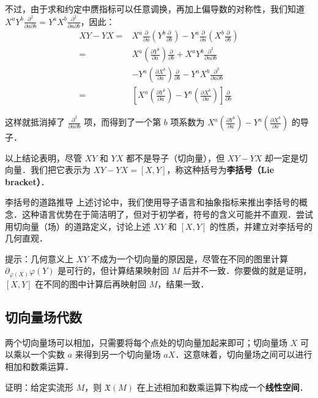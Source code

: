 不过，由于求和约定中赝指标可以任意调换，再加上偏导数的对称性，我们知道 $X^aY^b\frac{\partial^2}{\partial a\partial b}=Y^aX^b\frac{\partial^2}{\partial a\partial b}$，因此：
\begin{equation}
\begin{aligned}
XY-YX=&X^a\frac{\partial}{\partial a}(Y^b\frac{\partial}{\partial b})-Y^a\frac{\partial}{\partial a}(X^b\frac{\partial}{\partial b})\\
=&X^a(\frac{\partial Y^b}{\partial a})\frac{\partial}{\partial b}+X^aY^b\frac{\partial^2}{\partial a\partial b}\\&-Y^a(\frac{\partial X^b}{\partial a})\frac{\partial}{\partial b}-Y^aX^b\frac{\partial^2}{\partial a\partial b}\\
=&[X^a(\frac{\partial Y^b}{\partial a})-Y^a(\frac{\partial X^b}{\partial a})]\frac{\partial}{\partial b}
\end{aligned}
\end{equation}

这样就抵消掉了 $\frac{\partial^2}{\partial a\partial b}$ 项，而得到了一个第 $b$ 项系数为 $X^a(\frac{\partial Y^b}{\partial a})-Y^a(\frac{\partial X^b}{\partial a})$ 的导子．

以上结论表明，尽管 $XY$ 和 $YX$ 都不是导子（切向量），但 $XY-YX$ 却一定是切向量．我们把它表示为 $XY-YX=[X, Y]$，称这种括号为\textbf{李括号（Lie bracket）}．

\begin{exercise}{李括号的道路推导}\label{Vec_exe1}
上述讨论中，我们使用导子语言和抽象指标来推出李括号的概念．这种语言优势在于简洁明了，但对于初学者，符号的含义可能并不直观．尝试用切向量（场）的道路定义，讨论上述 $XY$ 和 $[X, Y]$ 的性质，并建立对李括号的几何直观．

提示：几何意义上 $XY$ 不成为一个切向量的原因是，尽管在不同的图里计算 $\partial_{\varphi(X)}\varphi(Y)$ 是可行的，但计算结果映射回 $M$ 后并不一致．你要做的就是证明，$[X, Y]$ 在不同的图中计算后再映射回 $M$，结果一致．
\end{exercise}

\subsection{切向量场代数}

两个切向量场可以相加，只需要将每个点处的切向量加起来即可；切向量场 $X$ 可以乘以一个实数 $a$ 来得到另一个切向量场 $aX$．这意味着，切向量场之间可以进行相加和数乘运算．

\begin{exercise}{}\label{Vec_exe2}
证明：给定实流形 $M$，则 $\mathfrak{X}(M)$ 在上述相加和数乘运算下构成一个\textbf{线性空间}．
\end{exercise}

